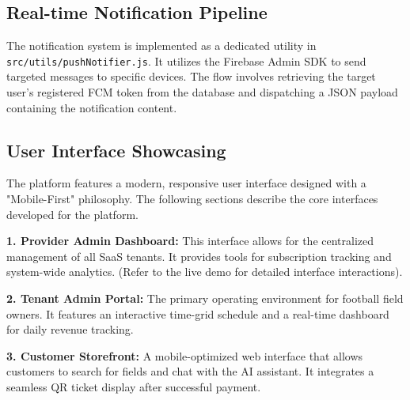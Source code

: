 \subsection{Real-time Notification Pipeline}
The notification system is implemented as a dedicated utility in \texttt{src/utils/\allowbreak pushNotifier.js}. It utilizes the Firebase Admin SDK to send targeted messages to specific devices. The flow involves retrieving the target user's registered FCM token from the database and dispatching a JSON payload containing the notification content.

\subsection{User Interface Showcasing}
The platform features a modern, responsive user interface designed with a "Mobile-First" philosophy. The following sections describe the core interfaces developed for the platform.

\textbf{1. Provider Admin Dashboard:} 
This interface allows for the centralized management of all SaaS tenants. It provides tools for subscription tracking and system-wide analytics. (Refer to the live demo for detailed interface interactions).

\textbf{2. Tenant Admin Portal:} 
The primary operating environment for football field owners. It features an interactive time-grid schedule and a real-time dashboard for daily revenue tracking.

\textbf{3. Customer Storefront:} 
A mobile-optimized web interface that allows customers to search for fields and chat with the AI assistant. It integrates a seamless QR ticket display after successful payment.

